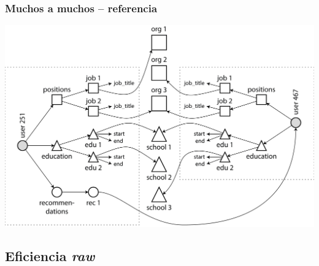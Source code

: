 \documentclass[14pt]{beamer}
\begin{document}
\begin{frame}
  \frametitle{Muchos a muchos -- referencia}
\includegraphics[width=\textwidth]{img/many-to-many}
\end{frame}



\subsection{Eficiencia {\em raw}}
\end{document}
